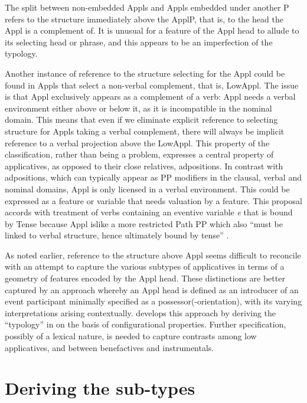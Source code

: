 \documentclass[output=paper,colorlinks,citecolor=brown,nonflat]{./langscibook}
\begin{document}
The split between non-embedded Appls and Appls embedded under another \liv P refers to the structure immediately above the ApplP, that is, to the head the Appl is a complement of. It is unusual for a feature of the Appl head to allude to its selecting head or phrase, and this appears to be an imperfection of the typology.

Another instance of reference to the structure selecting for the Appl could be found in Appls that select a non-verbal complement, that is, LowAppl. The issue is that Appl exclusively appears as a complement of a verb: Appl needs a verbal environment either above or below it, as it is incompatible in the nominal domain.  This means that even if we eliminate explicit reference to selecting structure for Appls taking a verbal complement, there will always be implicit reference to a verbal projection above the LowAppl. This property of the classification, rather than being a problem, expresses a central property of applicatives, as opposed to their close relatives, adpositions. In contrast with adpositions, which can typically appear as PP modifiers in the clausal, verbal and nominal domains, Appl is only licensed in a verbal environment. This could be expressed as a feature or variable that needs valuation by a \liv feature. This proposal accords with  treatment of verbs containing an eventive variable \textit{e} that is bound by Tense because Appl islike a more restricted Path PP which also “must be linked to verbal structure, hence ultimately bound by tense” \citep[35]{Svenonius2007}.

As noted earlier, reference to the structure above Appl seems difficult to reconcile with an attempt to capture the various subtypes of applicatives in terms of a geometry of features encoded by the Appl head. These distinctions are better captured by an approach whereby an Appl head is defined as an introducer of an event participant minimally specified as a possessor(-orientation), with its varying interpretations arising contextually.  develops this approach by deriving the “typology” in  on the basis of configurational properties. Further specification, possibly of a lexical nature, is needed to capture contrasts among low applicatives, and between benefactives and instrumentals.

\section{Deriving the sub-types}\label{sec:cuervo:4}
\end{document}
